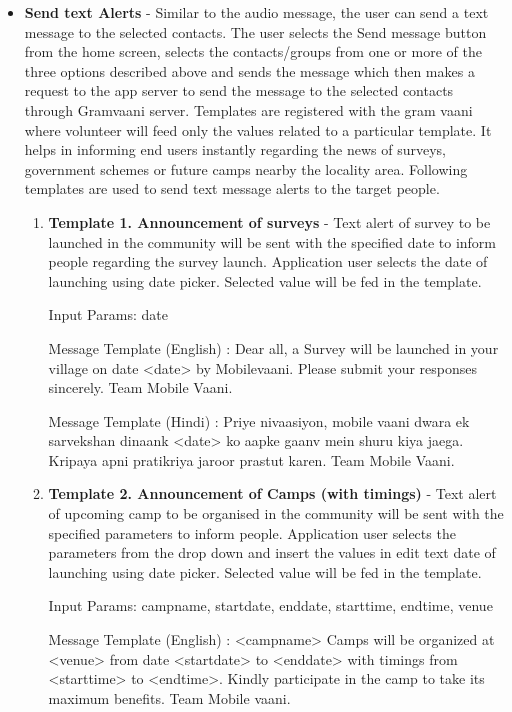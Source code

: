\begin{itemize}
\item\textbf {Send text Alerts} - Similar to the audio message, the user can
send a text message to the selected contacts. The user selects the Send
message button from the home screen, selects the contacts/groups from
one or more of the three options described above and sends the message
which then makes a request to the app server to send the message to
the selected contacts through Gramvaani server. Templates are registered with the gram vaani where volunteer will feed only the values related to a particular template. It helps in informing end users instantly regarding the news of surveys, government schemes or future camps nearby the locality area. Following templates are used to send text message alerts to the target people.

\begin{enumerate}
\item \textbf {Template 1. Announcement of surveys} - Text alert of survey to be launched in the community will be sent with the specified date to inform people regarding the survey launch. Application user selects the date of launching using date picker. Selected value will be fed in the template.

Input Params: date 

Message Template (English) : Dear all, a Survey ​will be launched in your village on date <date> by Mobilevaani. Please submit your responses sincerely. ​Team Mobile Vaani.
 
Message Template (Hindi) : Priye nivaasiyon​, mobile vaani dwara ​ek sarvekshan dinaank <date> ko ​aapke​ gaanv mein shuru kiya jaega. Kripaya apni pratikriya ​jaroor​  prastut karen. Team Mobile Vaani.

\item \textbf {Template 2. Announcement of Camps (with timings)} - Text alert of upcoming camp to be organised in the community will be sent with the specified parameters to inform people. Application user selects the parameters from the drop down and insert the values in edit text date of launching using date picker. Selected value will be fed in the template.

Input Params: campname,  startdate, enddate,  starttime, endtime, venue
 
Message Template (English) : <campname> Camps will be organized at <venue> from ​date <​startdate> ​to <enddate​> with timings from <starttime> to <endtime>. Kindly participate in the camp to take​ its maximum benefits. Team Mobile vaani.


\end{enumerate}
\end{itemize}
